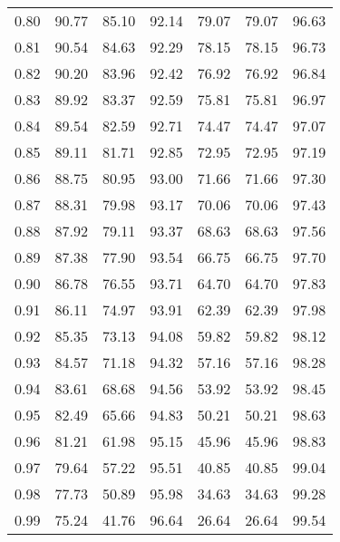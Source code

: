 \begin{tabular}{|c|c|c|c|c|c|c|}
      0.80 &     90.77 &     85.10 &      92.14 &   79.07 &      79.07 &         96.63 \\
      0.81 &     90.54 &     84.63 &      92.29 &   78.15 &      78.15 &         96.73 \\
      0.82 &     90.20 &     83.96 &      92.42 &   76.92 &      76.92 &         96.84 \\
      0.83 &     89.92 &     83.37 &      92.59 &   75.81 &      75.81 &         96.97 \\
      0.84 &     89.54 &     82.59 &      92.71 &   74.47 &      74.47 &         97.07 \\
      0.85 &     89.11 &     81.71 &      92.85 &   72.95 &      72.95 &         97.19 \\
      0.86 &     88.75 &     80.95 &      93.00 &   71.66 &      71.66 &         97.30 \\
      0.87 &     88.31 &     79.98 &      93.17 &   70.06 &      70.06 &         97.43 \\
      0.88 &     87.92 &     79.11 &      93.37 &   68.63 &      68.63 &         97.56 \\
      0.89 &     87.38 &     77.90 &      93.54 &   66.75 &      66.75 &         97.70 \\
      0.90 &     86.78 &     76.55 &      93.71 &   64.70 &      64.70 &         97.83 \\
      0.91 &     86.11 &     74.97 &      93.91 &   62.39 &      62.39 &         97.98 \\
      0.92 &     85.35 &     73.13 &      94.08 &   59.82 &      59.82 &         98.12 \\
      0.93 &     84.57 &     71.18 &      94.32 &   57.16 &      57.16 &         98.28 \\
      0.94 &     83.61 &     68.68 &      94.56 &   53.92 &      53.92 &         98.45 \\
      0.95 &     82.49 &     65.66 &      94.83 &   50.21 &      50.21 &         98.63 \\
      0.96 &     81.21 &     61.98 &      95.15 &   45.96 &      45.96 &         98.83 \\
      0.97 &     79.64 &     57.22 &      95.51 &   40.85 &      40.85 &         99.04 \\
      0.98 &     77.73 &     50.89 &      95.98 &   34.63 &      34.63 &         99.28 \\
      0.99 &     75.24 &     41.76 &      96.64 &   26.64 &      26.64 &         99.54 \\
\bottomrule
\end{tabular}
